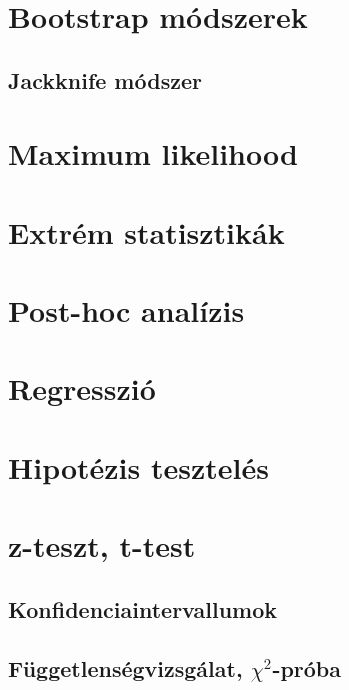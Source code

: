 \documentclass[12pt]{article}
\theoremstyle{plain}
\begin{document}
\section{Bootstrap módszerek}
\subsection{Jackknife módszer}
\section{Maximum likelihood}
\section{Extrém statisztikák}
\section{Post-hoc analízis}
\section{Regresszió}
\section{Hipotézis tesztelés}
\section{z-teszt, t-test}
\subsection{Konfidenciaintervallumok}
\subsection{Függetlenségvizsgálat, $\chi^2$-próba}



\end{document}
